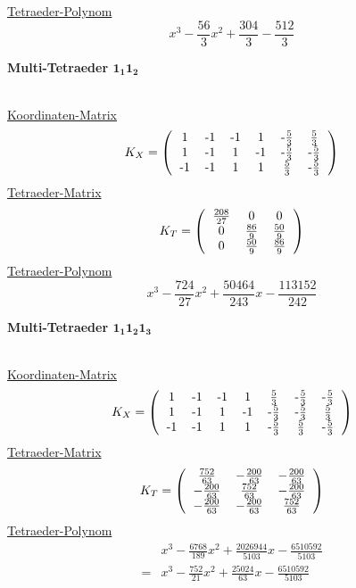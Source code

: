 \documentclass[12pt,titlepage,twoside,cleardoublepage]{article}
\theoremstyle{nummermitklammern}
\numberwithin{equation}{section}
\begin{document}
\underline{Tetraeder-Polynom}
\[
x^3-\frac{56}{3}x^2+\frac{304}{3}-\frac{512}{3}
\]
 \begin{large}
 \textbf{Multi-Tetraeder $\textbf{1}_\textbf{1}\textbf{1}_\textbf{2}$}
 \end{large}\\
 \underline{Koordinaten-Matrix}
\[ 
K_{X}=\left(\begin{tabular}{cccccc}
1&-1&-1&1&-$\frac{5}{3}$&$\frac{5}{3}$ \\
1&-1&1&-1&-$\frac{5}{3}$&-$\frac{5}{3}$\\
-1&-1&1&1&$\frac{5}{3}$&-$\frac{5}{3}$\\
\end{tabular}\right)
\] 
\underline{Tetraeder-Matrix}
\[
K_T=\left(\begin{tabular}{ccc}
$\frac{208}{27}$&0&0\\
0&$\frac{86}{9}$&$\frac{50}{9}$\\
0&$\frac{50}{9}$&$\frac{86}{9}$\\
\end{tabular}\right)
\] 
\underline{Tetraeder-Polynom}
\[
x^3-\frac{724}{27}x^2+\frac{50464}{243}x-\frac{113152}{242}
\]
\begin{large}
 \textbf{Multi-Tetraeder $\textbf{1}_\textbf{1}\textbf{1}_
 \textbf{2}\textbf{1}_
 \textbf{3}$}
\end{large} \\
 \underline{Koordinaten-Matrix}
 \[ 
K_{X}=\left(\begin{tabular}{ccccccc}
1&-1&-1&1&$\frac{5}{3}$&-$\frac{5}{3}$&-$\frac{5}{3}$ \\
1&-1&1&-1&-$\frac{5}{3}$&-$\frac{5}{3}$&$\frac{5}{3}$\\
-1&-1&1&1&-$\frac{5}{3}$&$\frac{5}{3}$&-$\frac{5}{3}$\\
\end{tabular}\right)
\] 
\underline{Tetraeder-Matrix}
\[
K_T=\left(\begin{tabular}{ccc}
$\frac{752}{63}$& $-\frac{200}{63}$&$ -\frac{200}{63}$ \\
 $-\frac{200}{63}$&$ \frac{752}{63}$&$ -\frac{200}{63}$\\
 $ -\frac{200}{63}$& $-\frac{200}{63}$& $\frac{752}{63}$ \\
\end{tabular}\right)
\]
\underline{Tetraeder-Polynom}
\begin{align*}
&x^3-\frac{6768}{189}x^2+\frac{2026944}{5103}x-\frac{6510592}{5103}\\
=&x^3-\frac{752}{21}x^2+\frac{25024}{63}x-\frac{6510592}{5103}
\end{align*}
\end{document}
